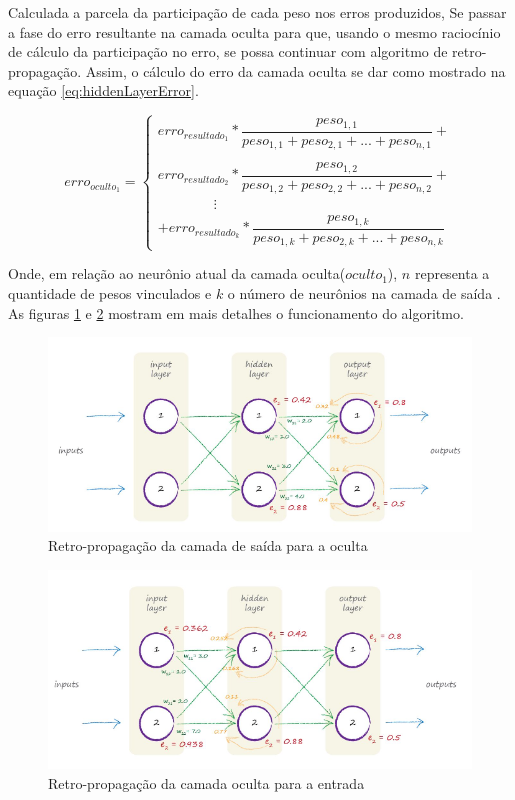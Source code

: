 \begin{apendicesenv}
		\par Calculada a parcela da participação de cada peso nos erros produzidos, Se passar a fase do erro resultante na camada oculta para que, usando o mesmo raciocínio de cálculo da participação no erro, se possa continuar com algoritmo de retro-propagação. Assim, o cálculo do erro da camada oculta se dar como mostrado na equação \ref{eq:hiddenLayerError}.
		
		\begin{equation}
			\label{eq:hiddenLayerError}
			erro_{oculto_1} = \begin{cases} 
				erro_{resultado_1}  * \dfrac{peso_{1,1}}{peso_{1,1} + peso_{2,1}+ ... + peso_{n,1}}  + \\\\
				erro_{resultado_2}  * \dfrac{peso_{1,2}}{peso_{1,2} + peso_{2,2}+ ... + peso_{n,2}}  + \\
				\qquad\qquad \vdots \\
				+ erro_{resultado_k}  * \dfrac{peso_{1,k}}{peso_{1,k} + peso_{2,k}+ ... + peso_{n,k}} 
			\end{cases}			 
		\end{equation}
	
		\par Onde, em relação ao neurônio atual da camada oculta($oculto_1$), $n$ representa a quantidade de pesos vinculados e $k$ o número de neurônios na camada de saída . As figuras \ref{fig:backpropagationerros1} e \ref{fig:backpropagationerros2} mostram em mais detalhes o funcionamento do algoritmo.
		
		\begin{figure}[H]
			\centering
			\caption{Retro-propagação da camada de saída para a oculta}
			\label{fig:backpropagationerros1}
			\includegraphics[width=0.7\linewidth]{images/TEMPbackpropagationErros1}
		\end{figure}
		
		
		\begin{figure}[H]
			\centering
			\caption{Retro-propagação da camada oculta para a entrada}
			\label{fig:backpropagationerros2}
			\includegraphics[width=0.7\linewidth]{images/TEMPbackpropagationErros2}
		\end{figure}
		

\end{apendicesenv}
